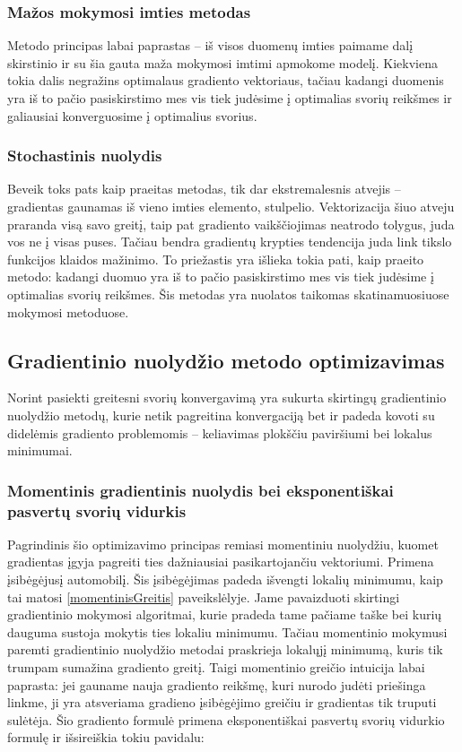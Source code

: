\documentclass[a4paper, 12pt]{article}
\begin{document}
%
\subsubsection{Mažos mokymosi imties metodas}
%

Metodo principas labai paprastas – iš visos duomenų imties paimame dalį skirstinio ir su šia gauta maža mokymosi imtimi apmokome modelį. Kiekviena tokia dalis negražins optimalaus gradiento vektoriaus, tačiau kadangi duomenis yra iš to pačio pasiskirstimo mes vis tiek judėsime į optimalias svorių reikšmes ir galiausiai konverguosime į optimalius svorius.

%
\subsubsection{Stochastinis nuolydis}
%

Beveik toks pats kaip praeitas metodas, tik dar ekstremalesnis atvejis – gradientas gaunamas iš vieno imties elemento, stulpelio. Vektorizacija šiuo atveju praranda visą savo greitį, taip pat gradiento vaikščiojimas neatrodo tolygus, juda vos ne į visas puses. Tačiau bendra gradientų krypties tendencija juda link tikslo funkcijos klaidos mažinimo. To priežastis yra išlieka tokia pati, kaip praeito metodo: kadangi duomuo yra iš to pačio pasiskirstimo mes vis tiek judėsime į optimalias svorių reikšmes. Šis metodas yra nuolatos taikomas skatinamuosiuose mokymosi metoduose.

%
\subsection{Gradientinio nuolydžio metodo optimizavimas}
%

Norint pasiekti greitesni svorių konvergavimą yra sukurta skirtingų gradientinio nuolydžio metodų, kurie netik pagreitina konvergaciją bet ir padeda kovoti su didelėmis gradiento problemomis – keliavimas plokščiu paviršiumi bei lokalus minimumai.

%
\subsubsection{Momentinis gradientinis nuolydis bei eksponentiškai pasvertų svorių vidurkis}
%

Pagrindinis šio optimizavimo principas remiasi momentiniu nuolydžiu, kuomet gradientas įgyja pagreiti ties dažniausiai pasikartojančiu vektoriumi. Primena įsibėgėjusį automobilį. Šis įsibėgėjimas padeda išvengti lokalių minimumu, kaip tai matosi \ref{momentinisGreitis} paveikslėlyje. Jame pavaizduoti skirtingi gradientinio mokymosi algoritmai, kurie pradeda tame pačiame taške bei kurių dauguma sustoja mokytis ties lokaliu minimumu. Tačiau momentinio mokymusi paremti gradientinio nuolydžio metodai praskrieja lokalųjį minimumą, kuris tik trumpam sumažina gradiento greitį. Taigi momentinio greičio intuicija labai paprasta: jei gauname nauja gradiento reikšmę, kuri nurodo judėti priešinga linkme, ji yra atsveriama gradieno įsibėgėjimo greičiu ir gradientas tik truputi sulėtėja. Šio gradiento formulė primena eksponentiškai pasvertų svorių vidurkio formulę ir išsireiškia tokiu pavidalu:
\end{document}
